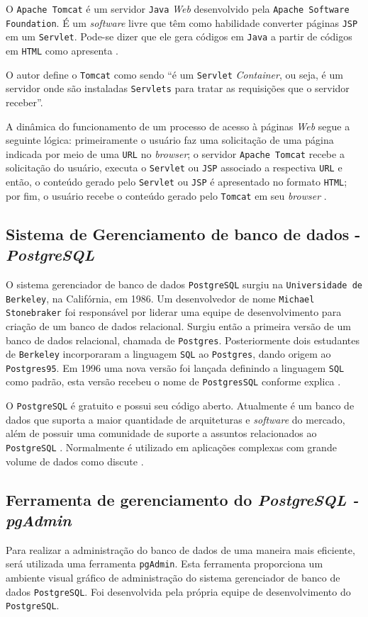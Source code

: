 O \texttt{Apache Tomcat} é um servidor \texttt{Java} \textit{Web} desenvolvido pela \texttt{Apache Software Foundation}. É um \textit{software} livre que têm como habilidade 
converter páginas \texttt{JSP} em um \texttt{Servlet}. Pode-se dizer que ele gera códigos em \texttt{Java} a partir de códigos em \texttt{HTML} como apresenta \cite{devmediatomcat}.

O autor \cite{flaviocoutinho} define o \texttt{Tomcat} como sendo “é um \texttt{Servlet} \textit{Container}, ou seja, é um servidor onde são instaladas \texttt{Servlets} 
para tratar as requisições que o servidor receber”.

A dinâmica do funcionamento de um processo de acesso à páginas \textit{Web} segue a seguinte lógica: primeiramente o usuário faz uma solicitação 
de uma página indicada por meio de uma \texttt{URL} no \textit{browser}; o servidor \texttt{Apache Tomcat} recebe a solicitação do usuário, executa o \texttt{Servlet} ou \texttt{JSP} 
associado a respectiva \texttt{URL} e então, o conteúdo gerado pelo \texttt{Servlet} ou \texttt{JSP} é apresentado no formato \texttt{HTML}; por fim, o usuário recebe o 
conteúdo gerado pelo \texttt{Tomcat} em seu \textit{browser} \cite{devmediatomcat}.


\subsection{Sistema de Gerenciamento de banco de dados - \textit{PostgreSQL}}

O sistema gerenciador de banco de dados \texttt{PostgreSQL} surgiu na \texttt{Universidade de Berkeley}, na Califórnia, em 1986.  Um desenvolvedor de nome 
\texttt{Michael Stonebraker} foi responsável por liderar uma equipe de desenvolvimento para criação de um banco de dados relacional. Surgiu então 
a primeira versão de um banco de dados relacional, chamada de \texttt{Postgres}. Posteriormente dois estudantes de \texttt{Berkeley} incorporaram a linguagem 
\texttt{SQL} ao \texttt{Postgres}, dando origem ao \texttt{Postgres95}. Em 1996 uma nova versão foi lançada definindo a linguagem \texttt{SQL} como padrão, esta versão recebeu
o nome de \texttt{PostgresSQL} conforme explica \cite{emersonalecrim}. 

O \texttt{PostgreSQL} é gratuito e possui seu código aberto. Atualmente é um banco de dados que suporta a maior quantidade de arquiteturas e \textit{software} 
do mercado, além de possuir uma comunidade de suporte a assuntos relacionados ao \texttt{PostgreSQL} \cite{postgrelinux}. Normalmente é utilizado em 
aplicações complexas com grande volume de dados como discute \cite{emersonalecrim}. 

\subsection{Ferramenta de gerenciamento do \textit{PostgreSQL - pgAdmin}}
 
 Para realizar a administração do banco de dados de uma maneira mais eficiente, será utilizada uma ferramenta \texttt{pgAdmin}.
 Esta ferramenta proporciona um ambiente visual gráfico de administração do sistema gerenciador de banco de dados \texttt{PostgreSQL}. 
 Foi desenvolvida pela própria equipe de desenvolvimento do \texttt{PostgreSQL}.
